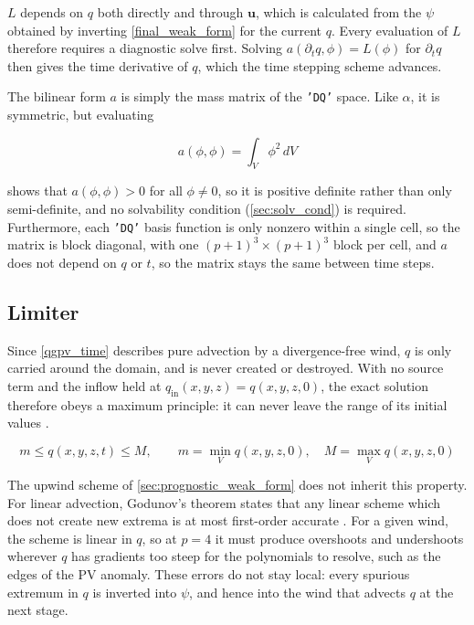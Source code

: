 \documentclass{article}
\begin{document}
$L$ depends on $q$ both directly and through $\bm u$, which is calculated from the $\psi$ obtained by inverting \cref{final_weak_form} for the current $q$.
Every evaluation of $L$ therefore requires a diagnostic solve first.
Solving $a(\partial_t q, \phi) = L(\phi)$ for $\partial_t q$ then gives the time derivative of $q$, which the time stepping scheme advances.

The bilinear form $a$ is simply the mass matrix of the \texttt{'DQ'} space.
Like $\alpha$, it is symmetric, but evaluating

\begin{equation}\label{mass_phi_phi}
    a(\phi, \phi) = \int_V {\phi^2 \,dV}
\end{equation}

shows that $a(\phi, \phi) > 0$ for all $\phi \neq 0$, so it is positive definite rather than only semi-definite, and no solvability condition (\cref{sec:solv_cond}) is required.
Furthermore, each \texttt{'DQ'} basis function is only nonzero within a single cell, so the matrix is block diagonal, with one $(p+1)^3 \times (p+1)^3$ block per cell, and $a$ does not depend on $q$ or $t$, so the matrix stays the same between time steps.

\subsection{Limiter}\label{sec:limiter}

Since \cref{qgpv_time} describes pure advection by a divergence-free wind, $q$ is only carried around the domain, and is never created or destroyed.
With no source term and the inflow held at $q_\text{in}(x,y,z) = q(x,y,z,0)$, the exact solution therefore obeys a maximum principle: it can never leave the range of its initial values \cite{ZhangShu2010}.

\begin{equation}\label{max_principle}
    m \leq q(x,y,z,t) \leq M, \qquad m = \min_V q(x,y,z,0), \quad M = \max_V q(x,y,z,0)
\end{equation}

The upwind scheme of \cref{sec:prognostic_weak_form} does not inherit this property.
For linear advection, Godunov's theorem states that any linear scheme which does not create new extrema is at most first-order accurate \cite{CockburnShu1991}.
For a given wind, the scheme is linear in $q$, so at $p=4$ it must produce overshoots and undershoots wherever $q$ has gradients too steep for the polynomials to resolve, such as the edges of the PV anomaly.
These errors do not stay local: every spurious extremum in $q$ is inverted into $\psi$, and hence into the wind that advects $q$ at the next stage.
\end{document}
